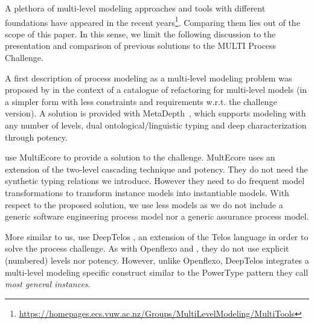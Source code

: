 
A plethora of multi-level modeling approaches and tools with different foundations have appeared in the recent years\footnote{\url{https://homepages.ecs.vuw.ac.nz/Groups/MultiLevelModeling/MultiTools}}. Comparing them lies out of the scope of this paper. In this sense, we limit the following discussion to the presentation and comparison of previous solutions to the MULTI Process Challenge.

A first description of process modeling as a multi-level modeling problem was proposed by \cite{lara2018refactoring} in the context of a catalogue of refactoring for multi-level models (in a simpler form with less constraints and requirements w.r.t. the challenge version). A solution is provided with MetaDepth~\citep{metadepth}, which supports modeling with any number of levels, dual ontological/linguistic typing and deep characterization through potency.

\cite{multiecore2019} use MultiEcore \citep{multecore2016} to provide a solution to the challenge. MultEcore uses an extension of the two-level cascading technique and potency. They do not need the synthetic typing relations we introduce. However they need to do frequent model transformations to transform instance models into instantiable models. With respect to the proposed solution, we use less models as we do not include a generic software engineering process model nor a generic assurance process model. %

More similar to us, \cite{deeptelos2019} use DeepTelos \citep{deeptelos2016}, an extension of the Telos language \citep{telos1990} in order to solve the process challenge. As with Openflexo and \FML, they do not use explicit (numbered) levels nor potency. However, unlike Openflexo, DeepTelos integrates a multi-level modeling specific construct similar to the PowerType \citep{atkinson2001essence} pattern they call \emph{most general instances}.


